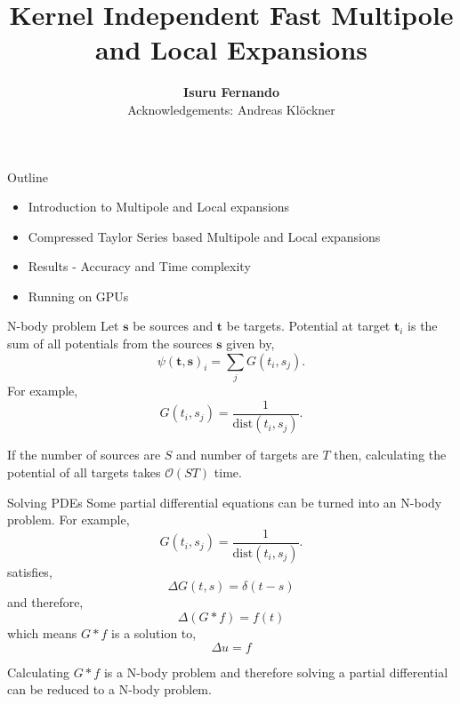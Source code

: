\documentclass[10pt]{beamer}
\title{Kernel Independent Fast Multipole and Local Expansions}
\author{\textbf{Isuru Fernando} \\ Acknowledgements: Andreas Kl{\"o}ckner}
\def\b#1{\mathbf{ #1}}
\begin{document}
\maketitle

\begin{frame}[fragile]{Outline}
 \begin{itemize}
  \item Introduction to Multipole and Local expansions
  \item Compressed Taylor Series based Multipole and Local expansions
  \item Results - Accuracy and Time complexity
  \item Running on GPUs
 \end{itemize}

\end{frame}

\begin{frame}[fragile]{N-body problem}
Let $\b s$ be sources and $\b t$ be targets. Potential at target $\b t_i$ is the sum of all potentials from the sources $\b s$ given by,
\[\psi(\b t, \b s)_i =  \sum_{j} G(t_i, s_j).\]
For example, \[G(t_i, s_j) = \frac{1}{\text{dist}(t_i, s_j)}.\]
\begin{center}
\end{center}
If the number of sources are $S$ and number of targets are $T$ then,
calculating the potential of all targets takes $\mathcal{O}(S T)$ time.

\end{frame}

\begin{frame}[fragile]{Solving PDEs}
 Some partial differential equations can be turned into an N-body problem.
 For example, \[G(t_i, s_j) = \frac{1}{\text{dist}(t_i, s_j)}.\]
 satisfies,
 \[
  \Delta G(t, s) = \delta(t - s)
 \]
 and therefore,
 \[
  \Delta (G * f) = f(t)
 \]
 which means $G * f$ is a solution to,
 \[
  \Delta u = f
 \]

 Calculating $G * f$ is a N-body problem and therefore solving a partial differential can be reduced to a N-body problem.


\end{frame}
\end{document}
